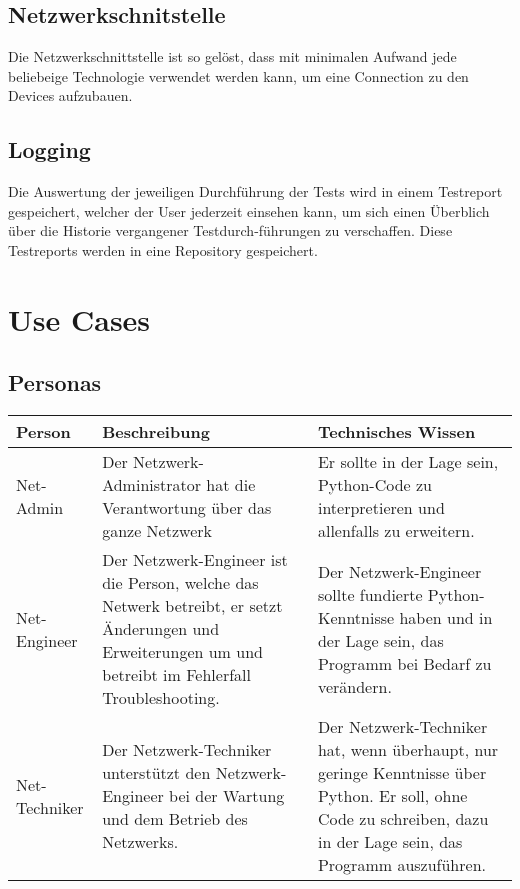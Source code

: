 \documentclass[
	ngerman,
	toc=listof, %
	toc=bibliography, %
	footnotes=multiple, %
	parskip=half, %
	numbers=noendperiod %
]{scrartcl}
\begin{document}
	\subsection{Netzwerkschnitstelle}
		Die Netzwerkschnittstelle ist so gelöst, dass mit minimalen Aufwand jede beliebeige Technologie verwendet werden kann, um eine Connection zu den Devices aufzubauen.

	\subsection{Logging}
	Die Auswertung der jeweiligen Durchführung der Tests wird in einem Testreport gespeichert, welcher der User jederzeit einsehen kann, 
	um sich einen Überblich über die Historie vergangener Testdurch-führungen zu verschaffen. Diese Testreports werden in eine Repository gespeichert.








\section{Use Cases}
	\subsection{Personas}
		\begin{tabularx}{\textwidth}{lXX}
			\toprule
			Person & Beschreibung & Technisches Wissen \\
			\midrule
			Net-Admin & Der Netzwerk-Administrator hat die Verantwortung über das ganze Netzwerk & Er sollte in der Lage sein, Python-Code zu interpretieren und allenfalls zu erweitern.\\
			\midrule
			Net-Engineer & Der Netzwerk-Engineer ist die Person, welche das Netwerk betreibt, er setzt Änderungen und Erweiterungen um und betreibt im Fehlerfall Troubleshooting. & Der Netzwerk-Engineer sollte fundierte Python-Kenntnisse haben und in der Lage sein, das Programm bei Bedarf zu verändern. \\
			\midrule
			Net-Techniker & Der Netzwerk-Techniker unterstützt den Netzwerk-Engineer bei der Wartung und dem Betrieb des Netzwerks. & Der Netzwerk-Techniker hat, wenn überhaupt, nur geringe Kenntnisse über Python. Er soll, ohne Code zu schreiben, dazu in der Lage sein, das Programm auszuführen. \\
			\bottomrule
		\end{tabularx}
\end{document}
